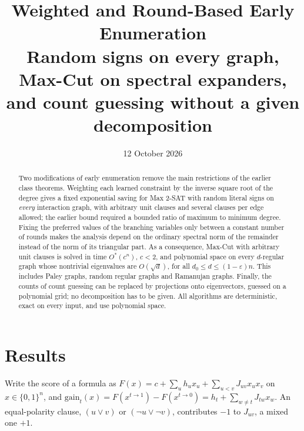 \documentclass[11pt,a4paper]{article}
\title{Weighted and Round-Based Early Enumeration\\
\large Random signs on every graph, Max-Cut on spectral expanders,\\
and count guessing without a given decomposition}
\author{}
\date{12 October 2026}
\theoremstyle{definition}
\theoremstyle{remark}
\newcommand{\Ostar}{O^{*}}
\begin{document}
\maketitle

\begin{abstract}
Two modifications of early enumeration remove the main restrictions of the
earlier class theorems. Weighting each learned constraint by the inverse square
root of the degree gives a fixed exponential saving for Max 2-SAT with random
literal signs on \emph{every} interaction graph, with arbitrary unit clauses and
several clauses per edge allowed; the earlier bound required a bounded ratio of
maximum to minimum degree. Fixing the preferred values of the branching
variables only between a constant number of rounds makes the analysis depend on
the ordinary spectral norm of the remainder instead of the norm of its
triangular part. As a consequence, Max-Cut with arbitrary unit clauses is solved
in time $\Ostar(c^n)$, $c<2$, and polynomial space on every $d$-regular graph
whose nontrivial eigenvalues are $O(\sqrt d)$, for all $d_0\le d\le(1-\varepsilon)n$.
This includes Paley graphs, random regular graphs and Ramanujan graphs.
Finally, the counts of count guessing can be replaced by projections onto
eigenvectors, guessed on a polynomial grid; no decomposition has to be given.
All algorithms are deterministic, exact on every input, and use polynomial space.
\end{abstract}

\section{Results}\label{sec:results}

Write the score of a formula as
$F(x)=c+\sum_uh_ux_u+\sum_{u<v}J_{uv}x_ux_v$ on $x\in\{0,1\}^n$, and
$\mathrm{gain}_t(x)=F(x^{t\to1})-F(x^{t\to0})=h_t+\sum_{w\ne t}J_{tw}x_w$.
An equal-polarity clause, $(u\lor v)$ or $(\neg u\lor\neg v)$, contributes $-1$
to $J_{uv}$, a mixed one $+1$.
\end{document}

